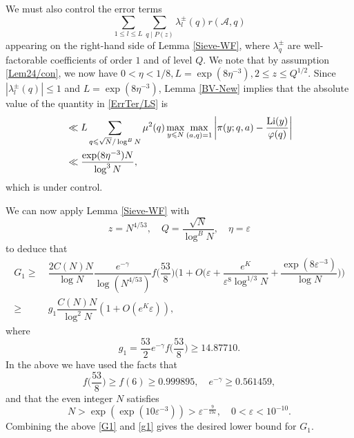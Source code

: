 \documentclass[12pt, a4paper]{amsart}
\def\Li{\hbox{{\rm Li}}}
\def\leq{\leqslant}
\def\le{\leqslant}
\def\ge{\geqslant}
\theoremstyle{plain}
\theoremstyle{remark}
\numberwithin{equation}{section}
\begin{document}
We must also control the error terms 
\begin{equation}\label{ErrTer/LS}
\sum_{1 \leq l \leq L }\sum_{q \mid P(z) } \lambda_l^{\pm} (q) r(\mathscr{A}, q)
\end{equation}
appearing on the right-hand side of Lemma \ref{Sieve-WF}, where $\lambda_q^{\pm}$ are well-factorable coefficients of order $1$ 
and of level $Q$. We note that by assumption \eqref{Lem24/con}, we now have 
$0 < \eta < 1/8, L=\exp(8\eta^{-3}),2 \leq z \leq Q^{1/2}$. 
Since $|\lambda_{l}^{\pm}(q)|\leq 1$ and $L=\exp(8\eta^{-3})$, 
Lemma \ref{BV-New} implies that the absolute value of the quantity in \eqref{ErrTer/LS} is 
\begin{equation}
\begin{aligned}
& \ll L\sum_{q\leq\sqrt{N}/\log^B N}\mu^{2}(q)\max_{y\le N}\max_{(a,q)=1}\bigg|\pi(y;q,a)-\frac{\Li(y)}{\varphi(q)}\bigg|\\
& \ll \frac{\exp(8\eta^{-3})N}{\log^{3} N},
\end{aligned}
\end{equation}
which is under control. 

We can now apply Lemma \ref{Sieve-WF} with
	$$
	z=N^{4/53},\quad Q=\frac{\sqrt{N}}{\log^{B} N}, \quad \eta=\varepsilon 
	$$
to deduce that  
\begin{equation}\label{G1}
\begin{aligned}
G_1\ge\ & \dfrac{2C(N)N}{\log N}\dfrac{e^{-\gamma}}{\log (N^{4/53})}f\bigg(\dfrac{53}{8}\bigg)\bigg(1+O\bigg(\varepsilon+\dfrac{e^K}{\varepsilon^8\log^{1/3} N}+\dfrac{\exp(8\varepsilon^{-3})}{\log  N}\bigg)\bigg)\\
\ge\ &g_1\dfrac{C(N)N}{\log^2 N}(1+O(e^K\varepsilon)),
\end{aligned}
\end{equation}
where 
\begin{equation}\label{g1}
g_1=\dfrac{53}{2}e^{-\gamma}f\bigg(\dfrac{53}{8}\bigg)\ge 14.87710. 
\end{equation}
In the above we have used the facts that 
	\begin{equation}\label{f6,e-gamma}
	f\bigg(\dfrac{53}{8}\bigg)\ge f(6)\ge 0.999895, \quad e^{-\gamma}\ge 0.561459,
	\end{equation}
and that the even integer $N$ satisfies
\begin{equation}\label{G1Error}
N>\exp(\exp(10\varepsilon^{-3}))>\varepsilon^{-\frac{9}{19\varepsilon}},\quad 0<\varepsilon<10^{-10}.
\end{equation}
Combining the above \eqref{G1} and \eqref{g1} gives the desired lower bound for $G_1$. 
\end{document}
